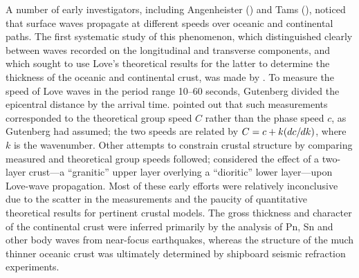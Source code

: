 A number of early investigators, including Angenheister
(\citeyear{angenheister21}) and Tams (\citeyear{tams21}),
noticed that surface waves propagate at different speeds
over oceanic and continental paths.  The first systematic
study of this phenomenon, which distinguished clearly between
waves recorded on the longitudinal and transverse components,
and which sought to use Love's theoretical results for the
latter to determine the thickness of the oceanic and continental
crust, was made by \textcite{gutenberg24}.  To measure the speed of
Love waves in the period range 10--60 seconds, Gutenberg divided the
epicentral distance by the arrival time.  \textcite{stoneley25} pointed
out that such measurements corresponded to the theoretical group speed $C$
%
%
rather than the phase speed $c$, as Gutenberg had assumed;
the two speeds are related by $C=c+k(dc/\hspace{-0.2 mm}dk)$,
where $k$ is the wavenumber.  Other attempts to constrain crustal
structure by comparing measured and theoretical group speeds followed;
\textcite{stoneley&tillotson28} considered the effect of a two-layer
crust---a ``granitic'' upper layer overlying a ``dioritic'' lower
layer---upon Love-wave propagation.  Most of these early efforts
were relatively inconclusive due to the scatter in the measurements
and the paucity of quantitative theoretical results for pertinent
crustal models.  The gross thickness and character
of the continental crust were
inferred primarily by the analysis of Pn, Sn and other body waves
from near-focus earthquakes, whereas the structure of the
much thinner oceanic crust was
ultimately determined by shipboard seismic refraction experiments.


